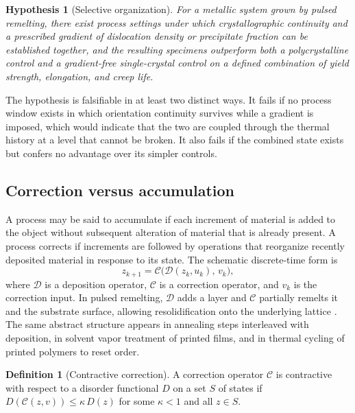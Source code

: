 \documentclass[11pt]{article}
\newtheorem{hypothesis}{Hypothesis}
\theoremstyle{definition}
\newtheorem{definition}{Definition}
\begin{document}
\begin{hypothesis}[Selective organization]
\label{hyp:selective}
For a metallic system grown by pulsed remelting, there exist process settings under which crystallographic continuity and a prescribed gradient of dislocation density or precipitate fraction can be established together, and the resulting specimens outperform both a polycrystalline control and a gradient-free single-crystal control on a defined combination of yield strength, elongation, and creep life.
\end{hypothesis}

The hypothesis is falsifiable in at least two distinct ways. It fails if no process window exists in which orientation continuity survives while a gradient is imposed, which would indicate that the two are coupled through the thermal history at a level that cannot be broken. It also fails if the combined state exists but confers no advantage over its simpler controls.

\subsection{Correction versus accumulation}

A process may be said to accumulate if each increment of material is added to the object without subsequent alteration of material that is already present. A process corrects if increments are followed by operations that reorganize recently deposited material in response to its state. The schematic discrete-time form is
\begin{equation}
z_{k+1}=\mathcal{C}\bigl(\mathcal{D}(z_k,u_k),\,v_k\bigr),
\end{equation}
where $\mathcal{D}$ is a deposition operator, $\mathcal{C}$ is a correction operator, and $v_k$ is the correction input. In pulsed remelting, $\mathcal{D}$ adds a layer and $\mathcal{C}$ partially remelts it and the substrate surface, allowing resolidification onto the underlying lattice \cite{liu2026}. The same abstract structure appears in annealing steps interleaved with deposition, in solvent vapor treatment of printed films, and in thermal cycling of printed polymers to reset order.

\begin{definition}[Contractive correction]
A correction operator $\mathcal{C}$ is contractive with respect to a disorder functional $D$ on a set $S$ of states if $D(\mathcal{C}(z,v))\le \kappa\,D(z)$ for some $\kappa<1$ and all $z\in S$.
\end{definition}
\end{document}

